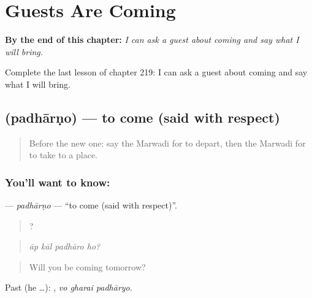 
\chapter{Guests Are Coming}
\label{ch:mw-guests-are-coming}

\begin{chapteropening}
\textbf{By the end of this chapter:} \emph{I can ask a guest about coming and say what I will bring.}

Complete the last lesson of chapter 219: I can ask a guest about coming and say what I will bring.
\end{chapteropening}

\section[\texorpdfstring{\mw{पधारणो} (padhārṇo)}{पधारणो (padhārṇo)}]{ (padhārṇo) — to come (said with respect)}

\label{lesson:MW-C219-padharno}



\begin{quote}
Before the new one: say the Marwadi for to depart, then the Marwadi for to take to a place.
\end{quote}

\subsection*{You'll want to know: }
\textbf{} — \emph{padhārṇo} — \textquotedblleft{}to come (said with respect)\textquotedblright{}.

\begin{quote}
   ?
\end{quote}

\begin{quote}
\emph{āp kāl padhāro ho?}
\end{quote}

\begin{quote}
Will you be coming tomorrow?
\end{quote}

Past (he …):   , \emph{vo gharai padhāryo}.


